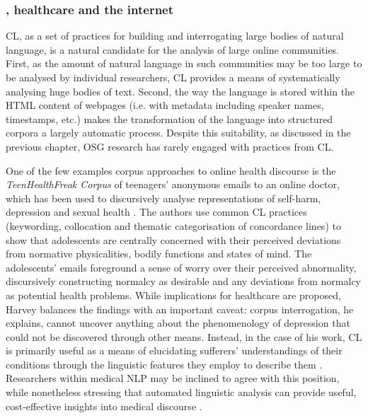 \subsubsection{, healthcare and the internet}

\gls{CL}, as a set of practices for building and interrogating large bodies of natural language, is a natural candidate for the analysis of large online communities. First, as the amount of natural language in such communities may be too large to be analysed by individual researchers, \gls{CL} provides a means of systematically analysing huge bodies of text. Second, the way the language is stored within the \gls{HTML} content of webpages (i.e. with metadata including speaker names, timestamps, etc.) makes the transformation of the language into structured corpora a largely automatic process. Despite this suitability, as discussed in the previous chapter, \gls{OSG} research has rarely engaged with practices from \gls{CL}. 

One of the few examples corpus approaches to online health discourse is the \emph{TeenHealthFreak Corpus} of teenagers' anonymous emails to an online doctor, which has been used to discursively analyse representations of self\hyp{}harm, depression and sexual health \cite[in][respectively]{harvey_disclosures_2012,harvey_health_2012,harvey_am_2007}. The authors use common \gls{CL} practices (keywording, collocation and thematic categorisation of concordance lines) to show that adolescents are centrally concerned with their perceived deviations from normative physicalities, bodily functions and states of mind. The adolescents' emails foreground a sense of worry over their perceived abnormality, discursively constructing normalcy as desirable and any deviations from normalcy as potential health problems. While implications for healthcare are proposed, Harvey balances the findings with an important caveat: \gls{corpus} interrogation, he explains, cannot uncover anything about the phenomenology of depression that could not be discovered through other means. Instead, in the case of his work, \gls{CL} is primarily useful as a means of elucidating sufferers' understandings of their conditions through the linguistic features they employ to describe them \cite{harvey_disclosures_2012}. Researchers within medical NLP may be inclined to agree with this position, while nonetheless stressing that automated linguistic analysis can provide useful, cost\hyp{}effective insights into medical discourse \cite{maclean_forum77:_2015}.

